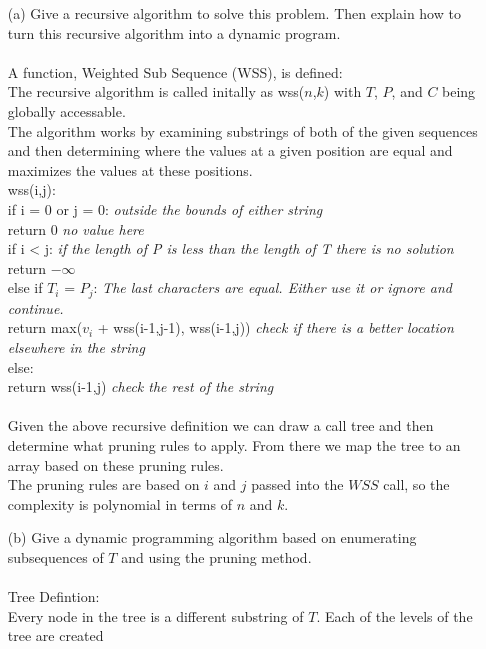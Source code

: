 \documentclass[10pt]{article}
\newcommand{\tab}{\hspace*{2em}}
\newcommand{\tabb}{\hspace*{4em}}
\begin{document}
	\begin{enumerate}
		\item[(a)]	Give a recursive algorithm to solve this problem. Then explain how to turn this recursive algorithm
					into a dynamic program.\\
					\\
					A function, Weighted Sub Sequence (WSS), is defined:\\
					The recursive algorithm is called initally as wss($n$,$k$) with $T$, $P$, and $C$ being globally accessable.\\
					The algorithm works by examining substrings of both of the given sequences and then determining where 
					the values at a given position are equal and maximizes the values at these positions. 
					\\
					wss(i,j):\\
					\tab if i = 0 or j = 0: \emph{outside the bounds of either string}\\
					\tabb return 0 \emph{no value here}\\
					\tab if i < j: \emph{if the length of P is less than the length of T there is no solution}\\
					\tabb return $- \infty$\\
					\tab else if $T_i$ = $P_j$: \emph{The last characters are equal. Either use it or ignore and continue.}\\
					\tabb return max($v_i$ + wss(i-1,j-1), wss(i-1,j)) \emph{check if there is a better location elsewhere in the string}\\
					\tab else:\\
					\tabb return wss(i-1,j) \emph{check the rest of the string}\\
					\\
					Given the above recursive definition we can draw a call tree and then determine what pruning rules
					to apply. From there we map the tree to an array based on these pruning rules.\\
					The pruning rules are based on $i$ and $j$ passed into the $WSS$ call, so the complexity
					is polynomial in terms of $n$ and $k$.\\
		\item[(b)]	Give a dynamic programming algorithm based on enumerating subsequences of $T$ and using the
					pruning method.\\
					\\
					Tree Defintion:\\
					Every node in the tree is a different substring of $T$. Each of the levels of the tree are created

\end{enumerate}
\end{document}
